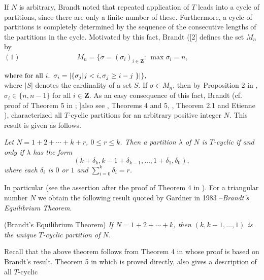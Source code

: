 \documentclass[oneside,12pt]{amsart}
\theoremstyle{definition}
\numberwithin{equation}{section}
\begin{document}
    If $N$ is arbitrary, Brandt noted  that
 repeated application of $T$ leads into a cycle of partitions, since 
 there are only  a finite number of these. 
Furthermore,  a cycle
 of  partitions is completely determined by the sequence
 of the consecutive lengths of the partitions in the cycle.
 Motivated by this fact, Brandt (\cite[p. 483]{br}[2] defines the set 
$M_n$ by\\
 
\noindent $
(1)\qquad\qquad\qquad\qquad  M_n=\{\sigma =(\sigma_i)_{i\in{\mathbf Z}}:\,\max\sigma_i=n,\,\,$ 

\noindent\qquad\qquad\qquad\qquad\quad ${\rm where
\, \, for\,\, all \,\,} i,\,
\,
 \sigma_i=|\{\sigma_j|j<i,\sigma_j\ge i-j\,\,
\}|\},
   $\\
   
\noindent where $|S|$ denotes the cardinality of a set $S$.
    If $\sigma\in M_n$, then by Proposition 2 in \cite{br},
   $\sigma_i\in \{n, n-1\}$ for all $i\in{\mathbf Z}$.
   As an easy consequence of this
   fact, Brandt (cf. proof of Theorem 5 in \cite{br}; 
]also see       \cite{ad}, Theorems 4 and 5,  \cite{gh}, Theorem 2.1 and
      Etienne   \cite{et}),
   characterized all $T$-cyclic partitions for an arbitrary positive 
integer $N$.
   This result is given as follows. 
 
   \vspace{2mm}

   {\it Let  $N=1+2+\cdots +k +r$,
   $0\le r\le k$. Then a partition $\lambda$ of $N$ is  $T$-cyclic if and
   only if $\lambda$ has the form
     $$
     (k+\delta_k, k-1+\delta_{k-1}, \ldots, 1+\delta_1,\delta_0),
      $$
      where each $\delta_i$ is $0$ or $1$ and $\sum_{i=0}^{k}\delta_i=r$.}

 \vspace{2mm}



In particular (see the assertion after the proof  of Theorem 4 in \cite{br}).
For a triangular number $N$ we obtain the following result
quoted by Gardner in 1983 \cite{ga}--{\it Brandt's Equilibrium Theorem}. 

   \vspace{2mm}
  (Brandt's Equilibrium Theorem)  
{\it If  $N=1+2+\cdots +k$,
then $(k,k-1,\ldots,1)$ is  the unique  $T$-cyclic partition of $N$.}

 \vspace{2mm}

 Recall that the above theorem follows from Theorem 4 in 
\cite{ad}  whose proof is based on Brandt's result. Theorem 5 in \cite{ad}
 which  is proved  directly, also gives a  description of all $T$-cyclic 
\end{document}
